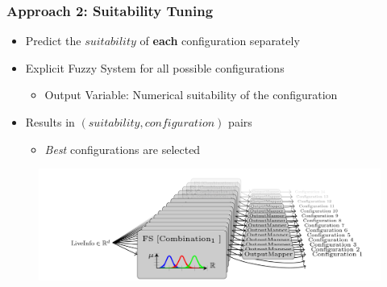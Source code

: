 \documentclass[
	10pt,
	t		%
]{beamer}
\begin{document}
\begin{frame}
	\frametitle{Approach 2: Suitability Tuning}
	\begin{itemize}
		\item Predict the $suitability$ of \textbf{each} configuration separately
		\item Explicit Fuzzy System for all possible configurations
		      \begin{itemize}
			      \item Output Variable: Numerical suitability of the configuration
		      \end{itemize}
		\item Results in $(suitability, configuration)$ pairs
		      \begin{itemize}
			      \item \textit{Best} configurations are selected
		      \end{itemize}
	\end{itemize}

	\begin{figure}
		\centering
		\includegraphics[width=1\textwidth]{figures/suitability-approach.png}
	\end{figure}
\end{frame}
\end{document}
